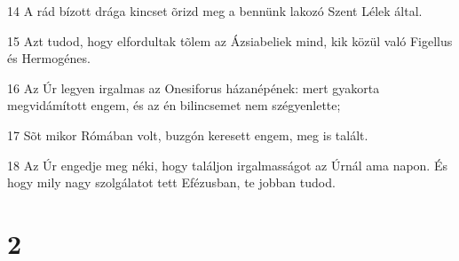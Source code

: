 \par 14 A rád bízott drága kincset õrizd meg a bennünk lakozó Szent Lélek által.
\par 15 Azt tudod, hogy elfordultak tõlem az Ázsiabeliek mind, kik közül való Figellus és Hermogénes.
\par 16 Az Úr legyen irgalmas az Onesiforus házanépének: mert gyakorta megvidámított engem, és az én bilincsemet nem szégyenlette;
\par 17 Sõt mikor Rómában volt, buzgón keresett engem, meg is talált.
\par 18 Az Úr engedje meg néki, hogy találjon irgalmasságot az Úrnál ama napon. És hogy mily nagy szolgálatot tett Efézusban, te jobban tudod.

\chapter{2}

